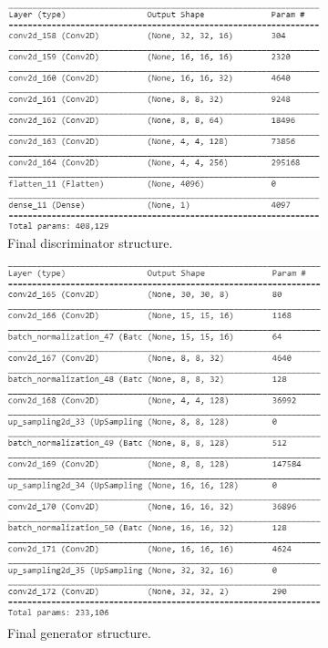 \documentclass{l4proj}
\begin{document}
\begin{figure}[H]
    \centering
    \begin{subfigure}[b]{0.48\textwidth}
        \includegraphics[width=\textwidth]{images/Discriminator.PNG}
        \caption{Final discriminator structure.}
    \end{subfigure}
    \quad
    \begin{subfigure}[b]{0.48\textwidth}
        \includegraphics[width=\textwidth]{images/Generator.PNG}
        \caption{Final generator structure.}
    \end{subfigure} 
    \caption{}
    \label{fig:gan_structure}
\end{figure}
\end{document}
